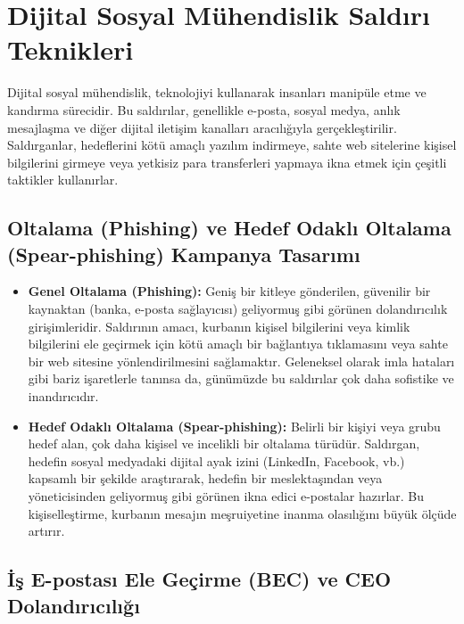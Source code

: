 \section{Dijital Sosyal Mühendislik Saldırı Teknikleri}

Dijital sosyal mühendislik, teknolojiyi kullanarak insanları manipüle etme ve kandırma sürecidir. Bu saldırılar, genellikle e-posta, sosyal medya, anlık mesajlaşma ve diğer dijital iletişim kanalları aracılığıyla gerçekleştirilir. Saldırganlar, hedeflerini kötü amaçlı yazılım indirmeye, sahte web sitelerine kişisel bilgilerini girmeye veya yetkisiz para transferleri yapmaya ikna etmek için çeşitli taktikler kullanırlar.

\subsection{Oltalama (Phishing) ve Hedef Odaklı Oltalama (Spear-phishing) Kampanya Tasarımı}

\begin{itemize}
    \item \textbf{Genel Oltalama (Phishing):} Geniş bir kitleye gönderilen, güvenilir bir kaynaktan (banka, e-posta sağlayıcısı) geliyormuş gibi görünen dolandırıcılık girişimleridir. Saldırının amacı, kurbanın kişisel bilgilerini veya kimlik bilgilerini ele geçirmek için kötü amaçlı bir bağlantıya tıklamasını veya sahte bir web sitesine yönlendirilmesini sağlamaktır. Geleneksel olarak imla hataları gibi bariz işaretlerle tanınsa da, günümüzde bu saldırılar çok daha sofistike ve inandırıcıdır.
    \item \textbf{Hedef Odaklı Oltalama (Spear-phishing):} Belirli bir kişiyi veya grubu hedef alan, çok daha kişisel ve incelikli bir oltalama türüdür. Saldırgan, hedefin sosyal medyadaki dijital ayak izini (LinkedIn, Facebook, vb.) kapsamlı bir şekilde araştırarak, hedefin bir meslektaşından veya yöneticisinden geliyormuş gibi görünen ikna edici e-postalar hazırlar. Bu kişiselleştirme, kurbanın mesajın meşruiyetine inanma olasılığını büyük ölçüde artırır.
\end{itemize}

\subsection{İş E-postası Ele Geçirme (BEC) ve CEO Dolandırıcılığı}

